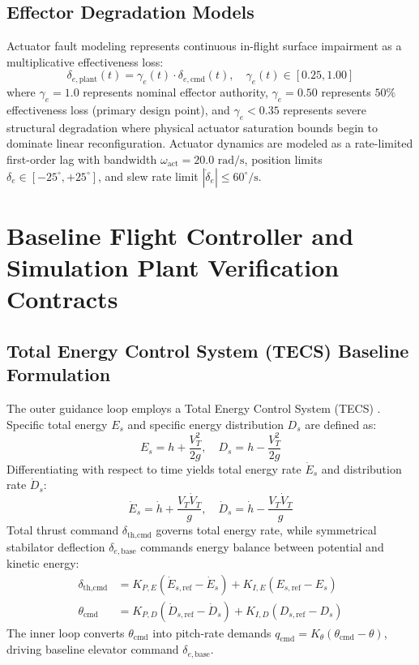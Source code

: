 \documentclass[review,12pt]{elsarticle}
\begin{document}
\subsection{Effector Degradation Models}
Actuator fault modeling represents continuous in-flight surface impairment as a multiplicative effectiveness loss:
\begin{equation}
    \delta_{e,\text{plant}}(t) = \gamma_e(t) \cdot \delta_{e,\text{cmd}}(t), \quad \gamma_e(t) \in [0.25, 1.00]
\end{equation}
where $\gamma_e = 1.0$ represents nominal effector authority, $\gamma_e = 0.50$ represents $50\%$ effectiveness loss (primary design point), and $\gamma_e < 0.35$ represents severe structural degradation where physical actuator saturation bounds begin to dominate linear reconfiguration. Actuator dynamics are modeled as a rate-limited first-order lag with bandwidth $\omega_{\text{act}} = 20.0\text{ rad/s}$, position limits $\delta_e \in [-25^\circ, +25^\circ]$, and slew rate limit $|\dot{\delta}_e| \le 60^\circ/\text{s}$.

\section{Baseline Flight Controller and Simulation Plant Verification Contracts}
\label{sec:baseline}

\subsection{Total Energy Control System (TECS) Baseline Formulation}
The outer guidance loop employs a Total Energy Control System (TECS) \cite{Lambregts1983}. Specific total energy $E_s$ and specific energy distribution $D_s$ are defined as:
\begin{equation}
    E_s = h + \frac{V_T^2}{2g}, \quad D_s = h - \frac{V_T^2}{2g}
\end{equation}
Differentiating with respect to time yields total energy rate $\dot{E}_s$ and distribution rate $\dot{D}_s$:
\begin{equation}
    \dot{E}_s = \dot{h} + \frac{V_T \dot{V}_T}{g}, \quad \dot{D}_s = \dot{h} - \frac{V_T \dot{V}_T}{g}
\end{equation}
Total thrust command $\delta_{\text{th,cmd}}$ governs total energy rate, while symmetrical stabilator deflection $\delta_{e,\text{base}}$ commands energy balance between potential and kinetic energy:
\begin{align}
    \delta_{\text{th,cmd}} &= K_{P,E} (\dot{E}_{s,\text{ref}} - \dot{E}_s) + K_{I,E} (E_{s,\text{ref}} - E_s) \\
    \theta_{\text{cmd}} &= K_{P,D} (\dot{D}_{s,\text{ref}} - \dot{D}_s) + K_{I,D} (D_{s,\text{ref}} - D_s)
\end{align}
The inner loop converts $\theta_{\text{cmd}}$ into pitch-rate demands $q_{\text{cmd}} = K_\theta (\theta_{\text{cmd}} - \theta)$, driving baseline elevator command $\delta_{e,\text{base}}$.
\end{document}
